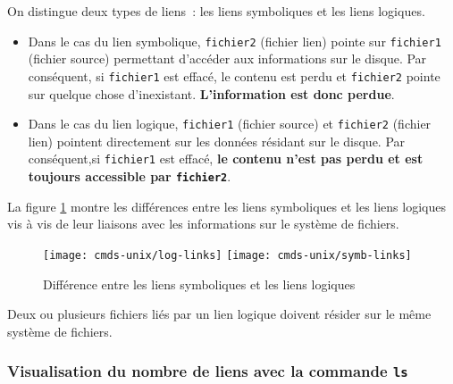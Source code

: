 On distingue deux types de liens~: les liens symboliques et les liens logiques.

\begin{itemize}
	\item	{}Dans le cas du lien symbolique, {\tt fichier2} (fichier lien)
			pointe sur {\tt fichier1} (fichier source) permettant d'acc{\'e}der
			aux informations sur le disque. Par cons{\'e}quent, si {\tt fichier1}
			est effac{\'e}, le contenu est perdu et {\tt fichier2} pointe
			sur quelque chose d'inexistant. {\bf L'information est donc perdue}.\\
	\item	{}Dans le cas du lien logique, {\tt fichier1} (fichier source) et
			{\tt fichier2} (fichier lien) pointent directement sur les donn{\'e}es
			r{\'e}sidant sur le disque. Par cons{\'e}quent,si {\tt fichier1} est effac{\'e},
			{\bf le contenu n'est pas perdu et est toujours accessible par
			{\tt fichier2}}.
\end{itemize}

La figure \ref{fig-cmds-links} montre les diff{\'e}rences entre les liens symboliques
et les liens logiques vis {\`a} vis de leur liaisons avec les informations sur
le syst{\`e}me de fichiers.

\begin{figure}[hbtp]
\centering
\texttt{[image: cmds-unix/log-links]}
\texttt{[image: cmds-unix/symb-links]}
\caption{\label{fig-cmds-links}Diff{\'e}rence entre les liens symboliques et les
liens logiques}
\end{figure}

\begin{remarque}
Deux ou plusieurs fichiers li{\'e}s par un lien logique doivent r{\'e}sider
sur le m{\^e}me syst{\`e}me de fichiers.
\end{remarque}

\subsubsection{\texorpdfstring{Visualisation du nombre de liens avec la commande {\tt ls}}{Visualisation du nombre de liens avec la commande ls}}

